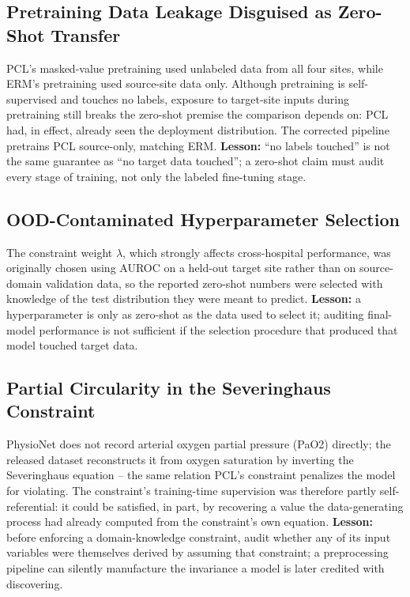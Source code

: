 \documentclass[pmlr,twocolumn,10pt]{jmlr} %
\begin{document}
\subsection{Pretraining Data Leakage Disguised as Zero-Shot Transfer}
PCL's masked-value pretraining used unlabeled data from all four sites,
while ERM's pretraining used source-site data only. Although pretraining is
self-supervised and touches no labels, exposure to target-site inputs during
pretraining still breaks the zero-shot premise the comparison depends on:
PCL had, in effect, already seen the deployment distribution. The corrected
pipeline pretrains PCL source-only, matching ERM. \textbf{Lesson:} ``no labels touched'' is not the same guarantee as ``no
target data touched''; a zero-shot claim must audit every stage of
training, not only the labeled fine-tuning stage.

\subsection{OOD-Contaminated Hyperparameter Selection}
The constraint weight $\lambda$, which strongly affects cross-hospital
performance, was originally chosen using AUROC on a held-out target site
rather than on source-domain validation data, so the reported zero-shot
numbers were selected with knowledge of the test distribution they were
meant to predict. \textbf{Lesson:} a hyperparameter is only as zero-shot as
the data used to select it; auditing final-model performance is not
sufficient if the selection procedure that produced that model touched
target data.

\subsection{Partial Circularity in the Severinghaus Constraint}
PhysioNet does not record arterial oxygen partial pressure (PaO2) directly;
the released dataset reconstructs it from oxygen saturation by inverting the
Severinghaus equation -- the same relation PCL's constraint penalizes the
model for violating. The constraint's training-time supervision was
therefore partly self-referential: it could be satisfied, in part, by
recovering a value the data-generating process had already computed from the
constraint's own equation. \textbf{Lesson:} before enforcing a
domain-knowledge constraint, audit whether any of its input variables were
themselves derived by assuming that constraint; a preprocessing pipeline can
silently manufacture the invariance a model is later credited with
discovering.
\end{document}
